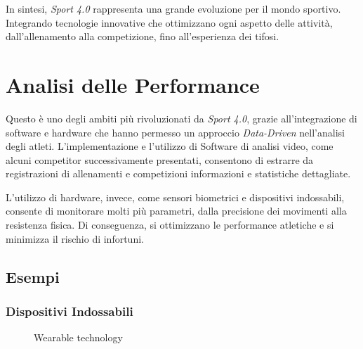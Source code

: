 \noindent In sintesi, \textit{Sport 4.0} rappresenta una grande evoluzione per il mondo sportivo. Integrando tecnologie innovative che ottimizzano ogni aspetto delle attività, dall'allenamento alla competizione, fino all'esperienza dei tifosi.

\section{Analisi delle Performance}

Questo è uno degli ambiti più rivoluzionati da \textit{Sport 4.0}, grazie all'integrazione di software e hardware che hanno permesso un approccio \textit{Data-Driven} nell'analisi degli atleti. L'implementazione e l'utilizzo di Software di analisi video, come alcuni competitor successivamente presentati, consentono di estrarre da registrazioni di allenamenti e competizioni informazioni e statistiche dettagliate.



L'utilizzo di hardware, invece, come sensori biometrici e dispositivi indossabili, consente di monitorare molti più parametri, dalla precisione dei movimenti alla resistenza fisica. Di conseguenza, si ottimizzano le performance atletiche e si minimizza il rischio di infortuni.

\pagebreak


\subsection{Esempi}
\vspace{\baselineskip}
\subsubsection{Dispositivi Indossabili}
\begin{figure}
    \centering
    \vspace{-10px}
    \caption{Wearable technology}
    \label{fig:Wearable technology}
\end{figure}

